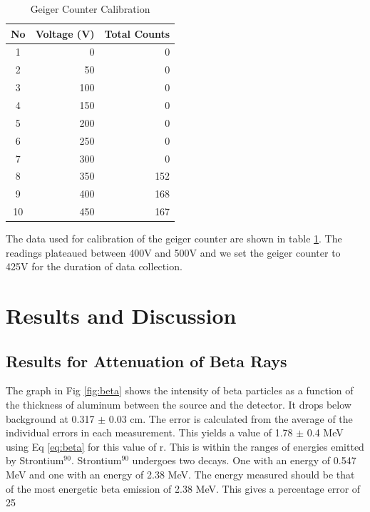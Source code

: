 \documentclass[twocolumn,secnumarabic,amssymb, nobibnotes, aps, pra]{revtex4}
\begin{document}
\begin{table} [h]  %
\caption{Geiger Counter Calibration}      %
\centering              %
\begin{tabular}{crr} %
\hline\hline %
  No & Voltage (V)  & Total Counts   \\
\hline %
1 & 0 & 0   \\
2 & 50 & 0   \\
3 & 100 & 0  \\
4 & 150 & 0  \\
5 & 200 & 0  \\
6 & 250 & 0  \\
7 & 300 & 0  \\
8 & 350 & 152  \\
9 & 400 & 168  \\
10 & 450 & 167 \\

\hline %
\end{tabular}
\label{tab:tuning}
\end{table}

The data used for calibration of the geiger counter are shown in table \ref{tab:tuning}. The readings plateaued between 400V and 500V and we set the geiger counter to 425V for the duration of data collection.


\section{Results and Discussion}



\subsection{Results for Attenuation of Beta Rays}

The graph in Fig \ref{fig:beta} shows the intensity of beta particles as a function of the thickness of aluminum between the source and the detector.  It drops below background at 0.317 $\pm$ 0.03 cm.  The error is calculated from the average of the individual errors in each measurement.  This yields a value of 1.78 $\pm$ 0.4 MeV using Eq \ref{eq:beta} for this value of r.  This is within the ranges of energies emitted by Strontium$^{90}$.  Strontium$^{90}$ undergoes two decays.  One with an energy of 0.547 MeV and one with an energy of 2.38 MeV.  The energy measured should be that of the most energetic beta emission of 2.38 MeV.  This gives a percentage error of 25%
\end{document}
